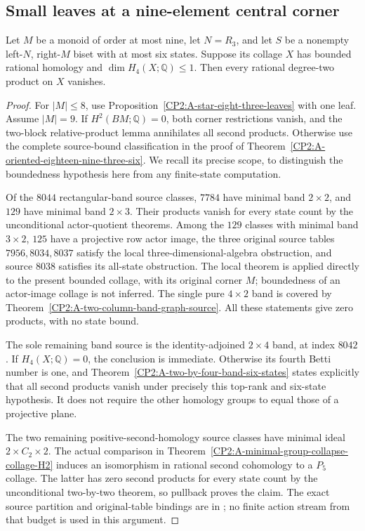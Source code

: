 \subsection{Small leaves at a nine-element central corner}

\begin{lemma}
\label{CP2:A-nine-right-zero-six-bounded-top}
Let $M$ be a monoid of order at most nine, let $N=R_3$, and let
$S$ be a nonempty left-$N$, right-$M$ biset with at most six states.
Suppose its collage $X$ has bounded rational homology and
$\dim H_4(X;\mathbb Q)\leq1$.  Then every rational degree-two
product on $X$ vanishes.
\end{lemma}
\begin{proof}
For $|M|\leq8$, use
Proposition~\ref{CP2:A-star-eight-three-leaves} with one leaf.
Assume $|M|=9$.  If $H^2(BM;\mathbb Q)=0$, both corner
restrictions vanish, and the two-block relative-product lemma
annihilates all second products.  Otherwise use the complete
source-bound classification in the proof of
Theorem~\ref{CP2:A-oriented-eighteen-nine-three-six}.
We recall its precise scope, to distinguish the boundedness
hypothesis here from any finite-state computation.

Of the $8044$ rectangular-band source classes, $7784$ have minimal
band $2\times2$, and $129$ have minimal band $2\times3$.
Their products vanish for every state count by the unconditional
actor-quotient theorems.  Among the $129$ classes with minimal
band $3\times2$, $125$ have a projective row actor image, the
three original source tables $7956,8034,8037$ satisfy the local
three-dimensional-algebra obstruction, and source $8038$ satisfies
its all-state obstruction.  The local theorem is applied directly
to the present bounded collage, with its original corner $M$;
boundedness of an actor-image collage is not inferred.
The single pure $4\times2$ band is covered by
Theorem~\ref{CP2:A-two-column-band-graph-source}.
All these statements give zero products, with no state bound.

The sole remaining band source is the identity-adjoined $2\times4$
band, at index $8042$.  If $H_4(X;\mathbb Q)=0$, the conclusion
is immediate.  Otherwise its fourth Betti number is one, and
Theorem~\ref{CP2:A-two-by-four-band-six-states} states explicitly
that all second products vanish under precisely this top-rank
and six-state hypothesis.  It does not require the other homology
groups to equal those of a projective plane.

The two remaining positive-second-homology source classes have
minimal ideal $2\times C_2\times2$.  The actual comparison in
Theorem~\ref{CP2:A-minimal-group-collapse-collage-H2} induces
an isomorphism in rational second cohomology to a $P_5$ collage.
The latter has zero second products for every state count by the
unconditional two-by-two theorem, so pullback proves the claim.
The exact source partition and original-table bindings are in
; no finite
action stream from that budget is used in this argument.
\end{proof}


